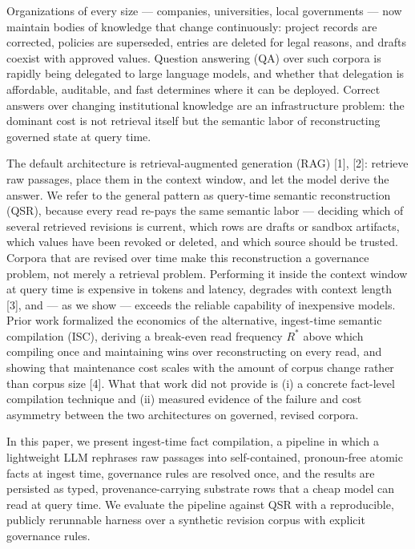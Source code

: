 \documentclass[conference,a4paper]{IEEEtran}
\begin{document}
Organizations of every size --- companies, universities, local governments --- now maintain bodies of knowledge that change continuously: project records are corrected, policies are superseded, entries are deleted for legal reasons, and drafts coexist with approved values. Question answering (QA) over such corpora is rapidly being delegated to large language models, and whether that delegation is affordable, auditable, and fast determines where it can be deployed. Correct answers over changing institutional knowledge are an infrastructure problem: the dominant cost is not retrieval itself but the semantic labor of reconstructing governed state at query time.

The default architecture is retrieval-augmented generation (RAG) [1], [2]: retrieve raw passages, place them in the context window, and let the model derive the answer. We refer to the general pattern as query-time semantic reconstruction (QSR), because every read re-pays the same semantic labor --- deciding which of several retrieved revisions is current, which rows are drafts or sandbox artifacts, which values have been revoked or deleted, and which source should be trusted. Corpora that are revised over time make this reconstruction a governance problem, not merely a retrieval problem. Performing it inside the context window at query time is expensive in tokens and latency, degrades with context length [3], and --- as we show --- exceeds the reliable capability of inexpensive models. Prior work formalized the economics of the alternative, ingest-time semantic compilation (ISC), deriving a break-even read frequency $R^{*}$ above which compiling once and maintaining wins over reconstructing on every read, and showing that maintenance cost scales with the amount of corpus change rather than corpus size [4]. What that work did not provide is (i) a concrete fact-level compilation technique and (ii) measured evidence of the failure and cost asymmetry between the two architectures on governed, revised corpora.

In this paper, we present ingest-time fact compilation, a pipeline in which a lightweight LLM rephrases raw passages into self-contained, pronoun-free atomic facts at ingest time, governance rules are resolved once, and the results are persisted as typed, provenance-carrying substrate rows that a cheap model can read at query time. We evaluate the pipeline against QSR with a reproducible, publicly rerunnable harness over a synthetic revision corpus with explicit governance rules.
\end{document}
